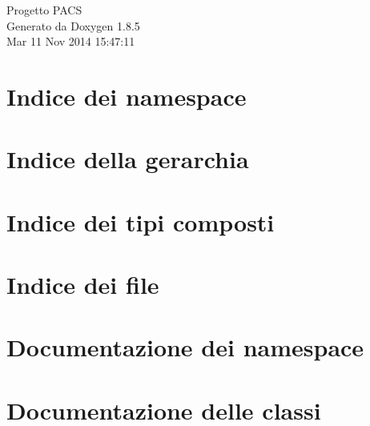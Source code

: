 \documentclass[twoside]{book}
\newcommand{\clearemptydoublepage}{%
  \newpage{\pagestyle{empty}\cleardoublepage}%
}
\begin{document}
\hypersetup{pageanchor=false}
\begin{titlepage}
\vspace*{7cm}
\begin{center}%
{\Large Progetto P\-A\-C\-S }\\
\vspace*{1cm}
{\large Generato da Doxygen 1.8.5}\\
\vspace*{0.5cm}
{\small Mar 11 Nov 2014 15:47:11}\\
\end{center}
\end{titlepage}
\clearemptydoublepage
\tableofcontents
\clearemptydoublepage
{}
\hypersetup{pageanchor=true}

\chapter{Indice dei namespace}

\chapter{Indice della gerarchia}

\chapter{Indice dei tipi composti}

\chapter{Indice dei file}

\chapter{Documentazione dei namespace}


\chapter{Documentazione delle classi}





















\end{document}

